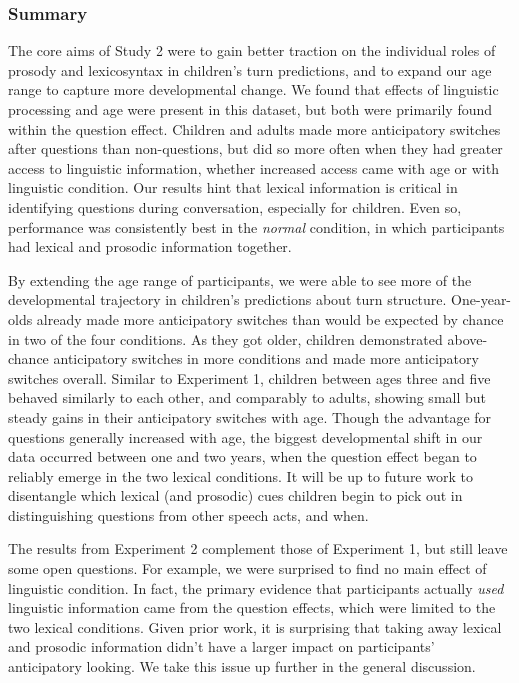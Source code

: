 \documentclass[authoryear, 12pt]{elsarticle}
\begin{document}
\subsubsection{Summary}

The core aims of Study 2 were to gain better traction on the individual roles of prosody and lexicosyntax in children's turn predictions, and to expand our age range to capture more developmental change. We found that effects of linguistic processing and age were present in this dataset, but both were primarily found within the question effect. Children and adults made more anticipatory switches after questions than non-questions, but did so more often when they had greater access to linguistic information, whether increased access came with age or with linguistic condition. Our results hint that lexical information is critical in identifying questions during conversation, especially for children. Even so, performance was consistently best in the \textit{normal} condition, in which participants had lexical and prosodic information together.

By extending the age range of participants, we were able to see more of the developmental trajectory in children's predictions about turn structure. One-year-olds already made more anticipatory switches than would be expected by chance in two of the four conditions. As they got older, children demonstrated above-chance anticipatory switches in more conditions and made more anticipatory switches overall. Similar to Experiment 1, children between ages three and five behaved similarly to each other, and comparably to adults, showing small but steady gains in their anticipatory switches with age. Though the advantage for questions generally increased with age, the biggest developmental shift in our data occurred between one and two years, when the question effect began to reliably emerge in the two lexical conditions. It will be up to future work to disentangle which lexical (and prosodic) cues children begin to pick out in distinguishing questions from other speech acts, and when.

The results from Experiment 2 complement those of Experiment 1, but still leave some open questions. For example, we were surprised to find no main effect of linguistic condition. In fact, the primary evidence that participants actually \textit{used} linguistic information came from the question effects, which were limited to the two lexical conditions. Given prior work, it is surprising that taking away lexical and prosodic information didn't have a larger impact on participants' anticipatory looking. We take this issue up further in the general discussion.
\end{document}
